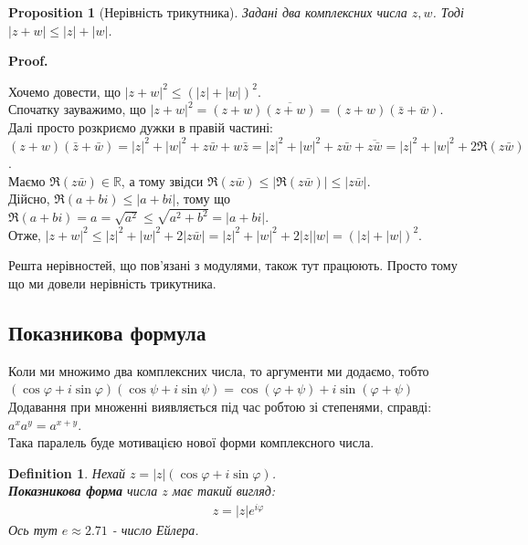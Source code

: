 \documentclass[a4paper, 10pt]{article}
\makeatletter
\def\qed{$\blacksquare$}
\theoremstyle{theoremdd}
\theoremstyle{theoremdd}
\newtheorem{definition}[theorem]{Definition}
\theoremstyle{theoremdd}
\theoremstyle{theoremdd}
\theoremstyle{theoremdd}
\newtheorem{proposition}[theorem]{Proposition}
\theoremstyle{theoremdd}
\theoremstyle{theoremdd}
\theoremstyle{theoremdd}
\renewenvironment{proof}[1][Proof.\\]{\par
\pushQED{\hfill \qed}%
\normalfont \topsep6\p@\@plus6\p@\relax
\trivlist
\item\relax
{\bfseries
#1\@addpunct{.}}\hspace\labelsep\ignorespaces
}{%
\popQED\endtrivlist\@endpefalse
}
\makeatother
\begin{document}
\begin{proposition}[Нерівність трикутника]
Задані два комплексних числа $z,w$. Тоді
$|z+w| \leq |z| + |w|$.
\end{proposition}

\begin{proof}
Хочемо довести, що $|z+w|^2 \leq (|z|+|w|)^2$.\\
Спочатку зауважимо, що $|z+w|^2 = (z+w)\overline{(z+w)} = (z+w)(\bar{z}+\bar{w})$.\\
Далі просто розкриємо дужки в правій частині:\\
$(z+w)(\bar{z}+\bar{w}) = |z|^2 + |w|^2 + z\bar{w} + w\bar{z} = |z|^2 + |w|^2 + z \bar{w} + \overline{z \bar{w}} = |z|^2 + |w|^2 + 2 \Re (z \bar{w})$.\\
Маємо $\Re (z \bar{w}) \in \mathbb{R}$, а тому звідси $\Re (z \bar{w}) \leq |\Re (z \bar{w})| \leq |z \bar{w}|$.\\
Дійсно, $\Re (a+bi) \leq |a+bi|$, тому що $\Re (a+bi) = a = \sqrt{a^2} \leq \sqrt{a^2+b^2} = |a+bi|$.\\
Отже, $|z+w|^2 \leq |z|^2 + |w|^2 + 2|z \bar{w}| = |z|^2 + |w|^2 + 2|z| |w| = (|z|+|w|)^2$.
\end{proof}

Решта нерівностей, що пов'язані з модулями, також тут працюють. Просто тому що ми довели нерівність трикутника.

\iffalse
\subsection{Показникова формула}
Коли ми множимо два комплексних числа, то аргументи ми додаємо, тобто\\
$(\cos \varphi + i \sin \varphi)(\cos \psi + i \sin \psi) = \cos (\varphi + \psi) + i \sin (\varphi + \psi)$\\
Додавання при множенні виявляється під час робтою зі степенями, справді:\\
$a^x a^y = a^{x+y}$.\\
Така паралель буде мотивацією нової форми комплексного числа.

\begin{definition}
Нехай $z = |z|(\cos \varphi + i \sin \varphi)$.\\
\textbf{Показникова форма} числа $z$ має такий вигляд:
\begin{align*}
z = |z|e^{i \varphi}
\end{align*}
Ось тут $e \approx 2.71$ - число Ейлера.
\end{definition}
\end{document}
